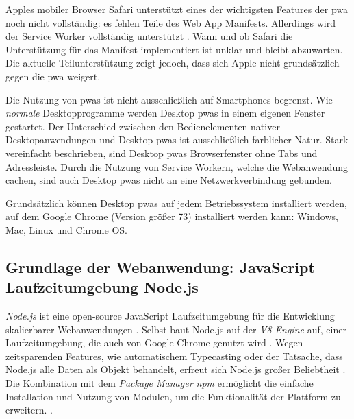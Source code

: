Apples mobiler Browser Safari unterstützt eines der wichtigsten Features der \ac{pwa} noch nicht vollständig: es fehlen Teile des Web App Manifests. Allerdings wird der Service Worker vollständig unterstützt \cite{CanIUseWebManifest}. Wann und ob Safari die Unterstützung für das Manifest implementiert ist unklar und bleibt abzuwarten. Die aktuelle Teilunterstützung zeigt jedoch, dass sich Apple nicht grundsätzlich gegen die \ac{pwa} weigert.





Die Nutzung von \ac{pwa}s ist nicht ausschließlich auf Smartphones begrenzt. Wie \textit{normale} Desktopprogramme werden Desktop \ac{pwa}s in einem eigenen Fenster gestartet. 
Der Unterschied zwischen den Bedienelementen nativer Desktopanwendungen und Desktop \ac{pwa}s ist ausschließlich farblicher Natur. Stark vereinfacht beschrieben, sind Desktop \ac{pwa}s Browserfenster ohne Tabs und Adressleiste. Durch die Nutzung von Service Workern, welche die Webanwendung cachen, sind auch Desktop \ac{pwa}s nicht an eine Netzwerkverbindung gebunden.

Grundsätzlich können Desktop \ac{pwa}s auf jedem Betriebssystem installiert werden, auf dem Google Chrome (Version größer 73) installiert werden kann: Windows, Mac, Linux und Chrome OS.
\cite{GooglePWADesktop}



\subsection{Grundlage der Webanwendung: JavaScript Laufzeitumgebung Node.js}

\textit{Node.js} ist eine open-source JavaScript Laufzeitumgebung für die Entwicklung skalierbarer Webanwendungen 
\cite{NodeJSWebsiteAbout}.
Selbst baut Node.js auf der \textit{V8-Engine} auf, einer Laufzeitumgebung, die auch von Google Chrome genutzt wird 
\cite[S. 1]{NodeJSRecepies}.
Wegen zeitsparenden Features, wie automatischem Typecasting oder der Tatsache, dass Node.js alle Daten als Objekt behandelt, erfreut sich Node.js großer Beliebtheit 
\cite[S. 12]{PracitalNodeJS}.
Die Kombination mit dem \textit{Package Manager npm} ermöglicht die einfache Installation und Nutzung von Modulen, um die Funktionalität der Plattform zu erweitern. 
\cite[S. 9]{NodeJSRecepies}.


